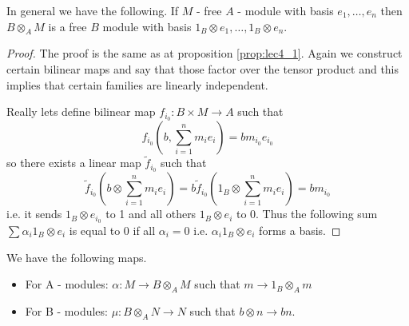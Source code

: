 \begin{proposition}
In general we have the following. If $M$ - free $A$ - module with
basis $e_1, \dots, e_n$ then $B \otimes_A M$ is a free $B$ module with
basis $1_B \otimes e_1, \dots, 1_B \otimes e_n$.
\begin{proof}
  The proof is the same as at proposition \ref{prop:lec4_1}. Again we
  construct certain bilinear maps and say that those factor over the
  tensor product and this implies that certain families are linearly
  independent.

  Really lets define bilinear map $f_{i_0}: B \times M \to A$ such that
  \[
  f_{i_0}\left(b, \sum_{i=1}^n m_i e_i\right) = b m_{i_0} e_{i_0}
  \]
  so there exists a linear map $\tilde{f}_{i_0}$ such that
  \[
  \tilde{f}_{i_0}\left(b \otimes \sum_{i=1}^n m_i e_i\right) =
  b \tilde{f}_{i_0}\left(1_B \otimes \sum_{i=1}^n m_i e_i \right) =
  b m_{i_0}
  \]
  i.e. it sends $1_B \otimes e_{i_0}$ to 1 and all others $1_B \otimes
  e_i$ to 0.
  Thus the following sum $\sum \alpha_i 1_B \otimes e_i$ is equal to 0
  if all $\alpha_i = 0$ i.e. $\alpha_i 1_B \otimes e_i$ forms a basis.
\end{proof}
\label{prop:lec4_Addon}
\end{proposition}

\begin{remark}
We have the following maps.
\begin{itemize}
  \label{item:lec4_maps}
\item For A - modules: $\alpha: M \to B \otimes_A M$ such that
  $m  \to 1_B \otimes_A m$
\item For B - modules:  $\mu: B \otimes_A N \to N$ such that
  $b \otimes n \to b n$.
\end{itemize}
\label{rem:lec4_maps}
\end{remark}

